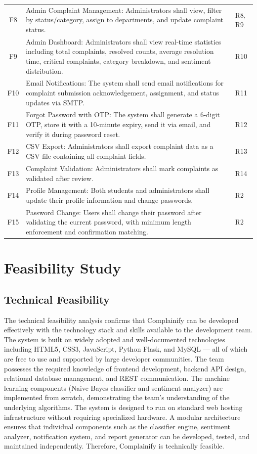 \documentclass[12pt,a4paper]{report}
\begin{document}
\begin{longtable}{cp{8cm}p{2cm}}
F8 & Admin Complaint Management: Administrators shall view, filter by status/category, assign to departments, and update complaint status. & R8, R9 \\
F9 & Admin Dashboard: Administrators shall view real-time statistics including total complaints, resolved counts, average resolution time, critical complaints, category breakdown, and sentiment distribution. & R10 \\
F10 & Email Notifications: The system shall send email notifications for complaint submission acknowledgement, assignment, and status updates via SMTP. & R11 \\
F11 & Forgot Password with OTP: The system shall generate a 6-digit OTP, store it with a 10-minute expiry, send it via email, and verify it during password reset. & R12 \\
F12 & CSV Export: Administrators shall export complaint data as a CSV file containing all complaint fields. & R13 \\
F13 & Complaint Validation: Administrators shall mark complaints as validated after review. & R14 \\
F14 & Profile Management: Both students and administrators shall update their profile information and change passwords. & R2 \\
F15 & Password Change: Users shall change their password after validating the current password, with minimum length enforcement and confirmation matching. & R2 \\
\end{longtable}

\section{Feasibility Study}

\subsection{Technical Feasibility}
The technical feasibility analysis confirms that Complainify can be developed effectively with the technology stack and skills available to the development team. The system is built on widely adopted and well-documented technologies including HTML5, CSS3, JavaScript, Python Flask, and MySQL — all of which are free to use and supported by large developer communities. The team possesses the required knowledge of frontend development, backend API design, relational database management, and REST communication. The machine learning components (Naive Bayes classifier and sentiment analyzer) are implemented from scratch, demonstrating the team's understanding of the underlying algorithms. The system is designed to run on standard web hosting infrastructure without requiring specialized hardware. A modular architecture ensures that individual components such as the classifier engine, sentiment analyzer, notification system, and report generator can be developed, tested, and maintained independently. Therefore, Complainify is technically feasible.
\end{document}
